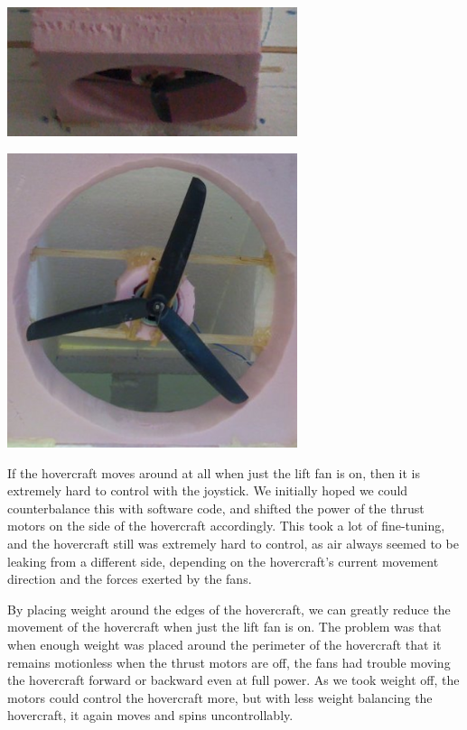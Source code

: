 \begin{center}
  \includegraphics[width=85mm]{imageSources/weightDistro1.png}
\end{center}
\label{weightDistro1}

\begin{center}
  \includegraphics[width=85mm]{imageSources/weightDistro2.png}
\end{center}
\label{weightDistro2}

If the hovercraft moves around at all when just the lift fan is on, then it is extremely hard to control with the joystick. We initially hoped we could counterbalance this with software code, and shifted the power of the thrust motors on the side of the hovercraft accordingly. This took a lot of fine-tuning, and the hovercraft still was extremely hard to control, as air always seemed to be leaking from a different side, depending on the hovercraft's current movement direction and the forces exerted by the fans.

By placing weight around the edges of the hovercraft, we can greatly reduce the movement of the hovercraft when just the lift fan is on. The problem was that when enough weight was placed around the perimeter of the hovercraft that it remains motionless when the thrust motors are off, the fans had trouble moving the hovercraft forward or backward even at full power. As we took weight off, the motors could control the hovercraft more, but with less weight balancing the hovercraft, it again moves and spins uncontrollably.

